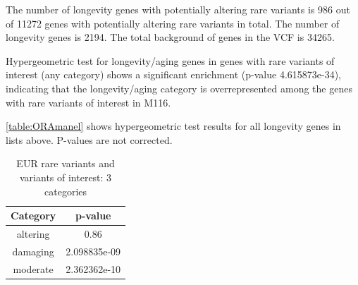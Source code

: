 \documentclass{article}\usepackage[]{graphicx}\usepackage[dvipsnames]{xcolor}
\begin{document}
The number of longevity genes with potentially altering rare variants is 986 out of 11272 genes with potentially altering rare variants in total. The number of longevity genes is 2194. The total background of genes in the VCF is 34265.

Hypergeometric test for longevity/aging genes in genes with rare variants of interest (any category) shows a significant enrichment (p-value 4.615873e-34), indicating that the longevity/aging category is overrepresented among the genes with rare variants of interest in M116.

\autoref{table:ORAmanel} shows hypergeometric test results for all longevity genes in lists above. P-values are not corrected.


\begin{table}[h!]
\centering
 \caption{EUR rare variants and variants of interest: 3 categories}
 \begin{tabular}{|c  c|} 
 \hline
Category  &  p-value \\ [0.5ex] 
 \hline\hline
altering & 0.86  \\
damaging &   2.098835e-09 \\
moderate & 2.362362e-10 \\[1ex] 
 \hline
 \end{tabular}
\label{table:ORAmanel}
\end{table}
\end{document}
